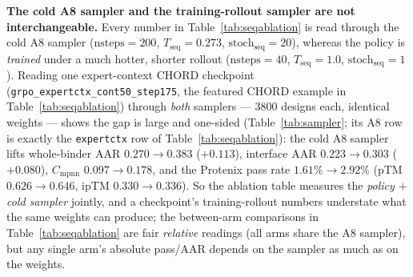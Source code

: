 \documentclass[11pt]{article}
\newcommand{\ttk}[1]{\texttt{\small #1}}
\begin{document}
\textbf{The cold A8 sampler and the training-rollout sampler are not interchangeable.} Every number in
Table~\ref{tab:seqablation} is read through the cold A8 sampler ($\mathrm{nsteps}{=}200$,
$T_{\mathrm{seq}}{=}0.273$, $\mathrm{stoch}_{\mathrm{seq}}{=}20$), whereas the policy is \emph{trained}
under a much hotter, shorter rollout ($\mathrm{nsteps}{=}40$, $T_{\mathrm{seq}}{=}1.0$,
$\mathrm{stoch}_{\mathrm{seq}}{=}1$). Reading one expert-context CHORD checkpoint
(\ttk{grpo\_expertctx\_cont50\_step175}, the featured CHORD example in Table~\ref{tab:seqablation})
through \emph{both} samplers --- $3800$ designs each, identical weights --- shows the gap is large and
one-sided (Table~\ref{tab:sampler}; its A8 row is exactly the \ttk{expertctx} row of
Table~\ref{tab:seqablation}): the cold A8 sampler lifts
whole-binder AAR $0.270\!\to\!0.383$ ($+0.113$), interface AAR $0.223\!\to\!0.303$ ($+0.080$),
$C_{\mathrm{mpnn}}$ $0.097\!\to\!0.178$, and the Protenix pass rate $1.61\%\!\to\!2.92\%$
(pTM $0.626\!\to\!0.646$, ipTM $0.330\!\to\!0.336$). So the ablation table measures the
\emph{policy $+$ cold sampler} jointly, and a checkpoint's training-rollout numbers understate what the
same weights can produce; the between-arm comparisons in Table~\ref{tab:seqablation} are fair
\emph{relative} readings (all arms share the A8 sampler), but any single arm's absolute pass/AAR
depends on the sampler as much as on the weights.
\end{document}
